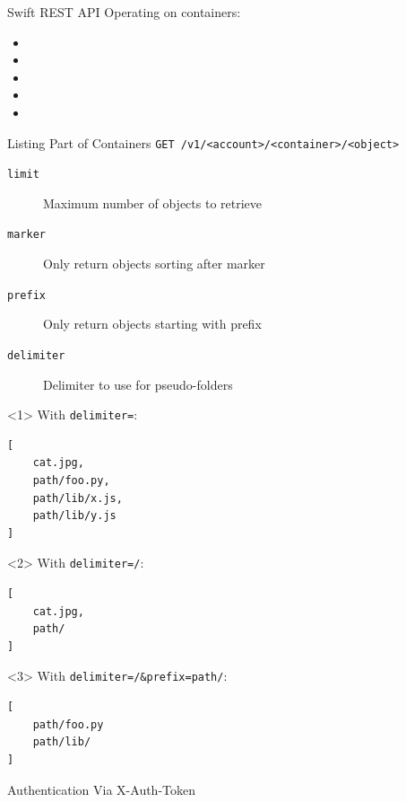 \documentclass[t,noamsthm]{beamer}
\begin{document}
\begin{frame}{Swift REST API}
  Operating on containers:
  \begin{itemize}
  \item {}
  \item {}
  \item {}
  \item {}
  \item {}
  \end{itemize}
\end{frame}

\begin{frame}[fragile]{Listing Part of Containers}
  \texttt{GET /v1/<account>/<container>/<object>}
  \begin{description}
  \item[\texttt{limit}] Maximum number of objects to retrieve
  \item[\texttt{marker}] Only return objects sorting after marker
  \item[\texttt{prefix}] Only return objects starting with prefix
  \item[\texttt{delimiter}] Delimiter to use for pseudo-folders
  \end{description}

\begin{onlyenv}<1>
  With \texttt{delimiter=}:
\begin{lstlisting}[]
[
    cat.jpg,
    path/foo.py,
    path/lib/x.js,
    path/lib/y.js
]
\end{lstlisting}
\end{onlyenv}
\begin{onlyenv}<2>
  With \texttt{delimiter=/}:
\begin{lstlisting}[]
[
    cat.jpg,
    path/
]
\end{lstlisting}
\end{onlyenv}
\begin{onlyenv}<3>
  With \texttt{delimiter=/\&prefix=path/}:
\begin{lstlisting}[]
[
    path/foo.py
    path/lib/
]
\end{lstlisting}
\end{onlyenv}
\end{frame}

\begin{frame}{Authentication}
  Via X-Auth-Token
\end{frame}
\end{document}
